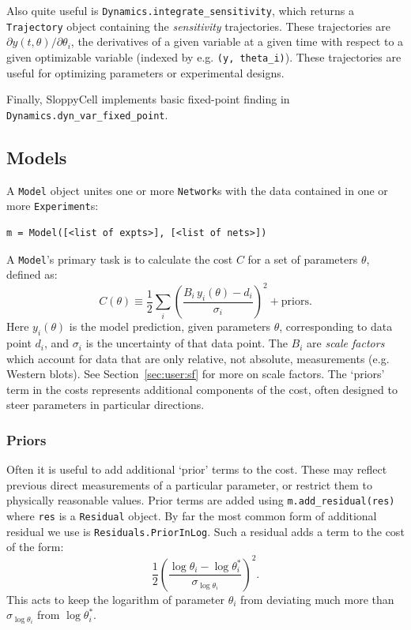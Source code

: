 \documentclass[12pt]{article}
\makeatletter
\newcommand{\py}[1]{\lstinline[language=Python, showstringspaces=False]@#1@}
\makeatother
\begin{document}
Also quite useful is \py{Dynamics.integrate_sensitivity}, which returns a \py{Trajectory} object containing the \emph{sensitivity} trajectories.
These trajectories are $\partial y(t, \theta)/\partial \theta_i$, the derivatives of a given variable at a given time with respect to a given optimizable variable (indexed by e.g. \py{(y, theta_i)}).
These trajectories are useful for optimizing parameters or experimental designs.

Finally, SloppyCell implements basic fixed-point finding in \py{Dynamics.dyn_var_fixed_point}.

\subsection{Models}
A \py{Model} object unites one or more \py{Network}s with the data contained in one or more \py{Experiment}s:
\begin{lstlisting}
m = Model([<list of expts>], [<list of nets>])
\end{lstlisting}
A \py{Model}'s primary task is to calculate the cost $C$ for a set of parameters $\theta$, defined as:
\begin{equation}
C\left(\theta\right) \equiv \frac{1}{2} \sum_i \left(\frac{B_i\,y_i\left(\theta\right) - d_i}{\sigma_i}\right)^2 + \text{priors}.\label{eqn:user:cost}
\end{equation}
Here $y_i(\theta)$ is the model prediction, given parameters $\theta$, corresponding to data point $d_i$, and $\sigma_i$ is the uncertainty of that data point.
The $B_i$ are \emph{scale factors} which account for data that are only relative, not absolute, measurements (e.g. Western blots).
See Section~\ref{sec:user:sf} for more on scale factors.
The `priors' term in the costs represents additional components of the cost, often designed to steer parameters in particular directions.

\subsubsection{Priors}
Often it is useful to add additional `prior' terms to the cost.
These may reflect previous direct measurements of a particular parameter, or  restrict them to physically reasonable values.
Prior terms are added using \py{m.add_residual(res)} where \py{res} is a \py{Residual} object.
By far the most common form of additional residual we use is \py{Residuals.PriorInLog}.
Such a residual adds a term to the cost of the form:
\begin{equation}
\frac{1}{2}\left(\frac{\log \theta_i - \log \theta_i^*}{\sigma_{\log \theta_i}}\right)^2.
\end{equation}
This acts to keep the logarithm of parameter $\theta_i$ from deviating much more than $\sigma_{\log \theta_i}$ from $\log \theta_i^*$.
\end{document}
